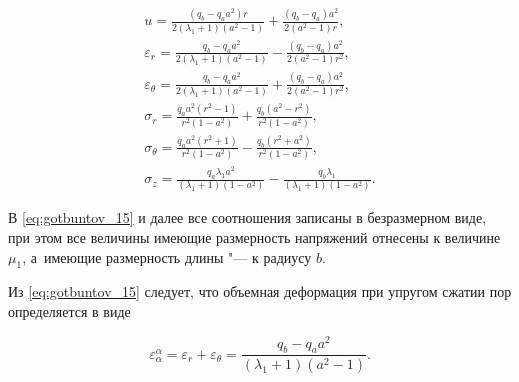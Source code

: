 \begin{equation}

\begin{array}{l}

\displaystyle

u=\frac{(q_b-q_a a^2)r}{2(\lambda_1+1)(a^2-1)} +\frac{(q_b-q_a)a^2}{2(a^2-1)r}, 

\\[3mm] 

\displaystyle

\varepsilon_r=\frac{q_b-q_aa^2}{2(\lambda_1+1)(a^2-1)}-\frac{(q_b-q_a)a^2}{2(a^2-1)r^2}, \\[3mm]

\displaystyle

\varepsilon_{\theta}=\frac{q_b-q_aa^2}{2(\lambda_1+1)(a^2-1)}+\frac{(q_b-q_a)a^2}{2(a^2-1)r^2}, 

\\[3mm]

\displaystyle

\sigma_r= \frac{q_a a^2(r^2-1)}{r^2(1-a^2)}+\frac{q_b (a^2-r^2)}{r^2(1-a^2)}, \\[3mm] 

\displaystyle

\sigma_{\theta}=\frac{q_a a^2(r^2+1)}{r^2(1-a^2)}-\frac{q_b (r^2+a^2)}{r^2(1-a^2)}, 

\\[3mm]

\displaystyle 

\sigma_z=  \frac{q_a\lambda_1a^2}{(\lambda_1+1)(1-a^2)}-\frac{q_b \lambda_1}{(\lambda_1+1)(1-a^2)}. 

\end{array}

\label{eq:gotbuntov_15}                           

\end{equation}



В \eqref{eq:gotbuntov_15} и далее все соотношения записаны в безразмерном виде, при этом все величины имеющие размерность напряжений отнесены к величине $\mu_1$, а~имеющие размерность длины "--- к радиусу $b$.



Из \eqref{eq:gotbuntov_15} следует, что объемная деформация при упругом сжатии пор определяется в виде 

\begin{equation} 

\label{eq:gotbuntov_16}

\varepsilon_{\alpha}^{\alpha}=\varepsilon_r+\varepsilon_{\theta}=\frac{q_b-q_a a^2}{(\lambda_1+1)(a^2-1)}. 

\end{equation}



